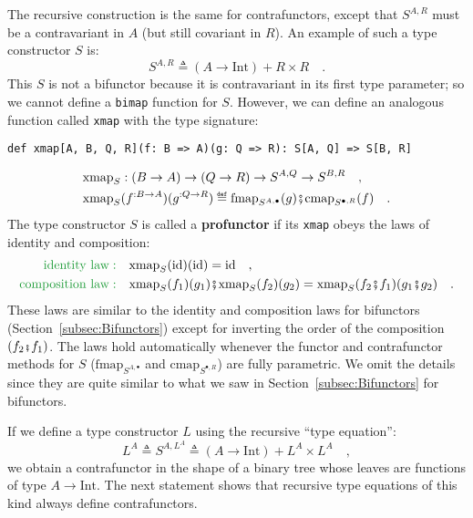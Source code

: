 The recursive construction is the same for contrafunctors, except
that $S^{A,R}$ must be a contravariant in $A$ (but still covariant
in $R$). An example of such a type constructor $S$ is:
\begin{equation}
S^{A,R}\triangleq\left(A\rightarrow\text{Int}\right)+R\times R\quad.\label{eq:f-example-contra-bifunctor}
\end{equation}
This $S$ is not a bifunctor because it is contravariant in its first
type parameter; so we cannot define a \lstinline!bimap! function
for $S$. However, we can define an analogous function called \lstinline!xmap!
with the type signature:
\begin{lstlisting}
def xmap[A, B, Q, R](f: B => A)(g: Q => R): S[A, Q] => S[B, R]
\end{lstlisting}
\begin{align*}
 & \text{xmap}_{S}:\left(B\rightarrow A\right)\rightarrow\left(Q\rightarrow R\right)\rightarrow S^{A,Q}\rightarrow S^{B,R}\quad,\\
 & \text{xmap}_{S}(f^{:B\rightarrow A})(g^{:Q\rightarrow R})\triangleq\text{fmap}_{S^{A,\bullet}}(g)\bef\text{cmap}_{S^{\bullet,R}}(f)\quad.
\end{align*}
The type constructor $S$ is called a \textbf{profunctor}
if its \lstinline!xmap! obeys the laws of identity and composition:
\begin{align}
{\color{greenunder}\text{identity law}:}\quad & \text{xmap}_{S}(\text{id})(\text{id})=\text{id}\quad,\label{eq:f-profunctor-identity-law}\\
{\color{greenunder}\text{composition law}:}\quad & \text{xmap}_{S}(f_{1})(g_{1})\bef\text{xmap}_{S}(f_{2})(g_{2})=\text{xmap}_{S}(f_{2}\bef f_{1})(g_{1}\bef g_{2})\quad.\label{eq:f-profunctor-composition-law}
\end{align}
These laws are similar to the identity and composition laws for bifunctors
(Section~\ref{subsec:Bifunctors}) except for inverting the order
of the composition $\left(f_{2}\bef f_{1}\right)$. The laws hold
automatically whenever the functor and contrafunctor methods for $S$
($\text{fmap}_{S^{A,\bullet}}$ and $\text{cmap}_{S^{\bullet,R}}$)
are fully parametric. We omit the details since they are quite similar
to what we saw in Section~\ref{subsec:Bifunctors} for bifunctors.

If we define a type constructor $L$ using the recursive \textsf{``}type equation\textsf{''}:
\[
L^{A}\triangleq S^{A,L^{A}}\triangleq\left(A\rightarrow\text{Int}\right)+L^{A}\times L^{A}\quad,
\]
we obtain a contrafunctor in the shape of a binary tree whose leaves
are functions of type $A\rightarrow\text{Int}$. The next statement
shows that recursive type equations of this kind always define contrafunctors.

